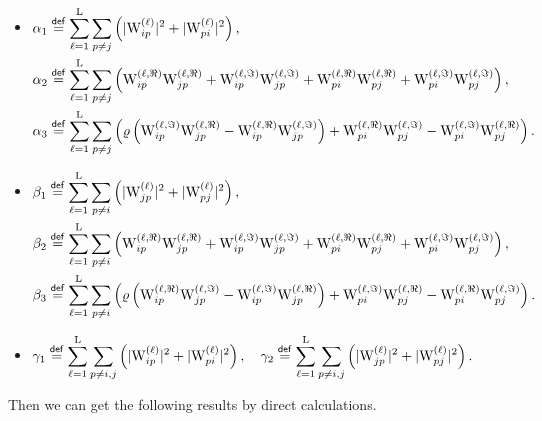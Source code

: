 \documentclass[final,onefignum,onetabnum]{siamart190516}
\newcommand{\eqdef}{\stackrel{\sf def}{=}}
\newcommand{\R}{\Re}
\newcommand{\I}{\Im}
\newcommand{\matrelem}[1]{\mathrm{#1}}
\begin{document}
\begin{itemize}
\item 
$\begin{aligned}[t]
&\alpha_{1} \eqdef  \sum_{\ell=1}^{\matrelem{L}}\sum_{p\neq j}\left(|\matrelem{W}^{(\ell)}_{ip}|^2+|\matrelem{W}^{(\ell)}_{pi}|^2\right), \\
&\alpha_{2} \eqdef  \sum_{\ell=1}^{\matrelem{L}}\sum_{p\neq j}\left(\matrelem{W}^{(\ell,\R)}_{ip}\matrelem{W}^{(\ell,\R)}_{jp}+\matrelem{W}^{(\ell,\I)}_{ip}\matrelem{W}^{(\ell,\I)}_{jp}+\matrelem{W}^{(\ell,\R)}_{pi}\matrelem{W}^{(\ell,\R)}_{pj}+\matrelem{W}^{(\ell,\I)}_{pi}\matrelem{W}^{(\ell,\I)}_{pj}\right), \\
&\alpha_{3} \eqdef   \sum_{\ell=1}^{\matrelem{L}}\sum_{p\neq j}\left(\varrho\left(\matrelem{W}^{(\ell,\I)}_{ip}\matrelem{W}^{(\ell,\R)}_{jp}-\matrelem{W}^{(\ell,\R)}_{ip}\matrelem{W}^{(\ell,\I)}_{jp}\right)+\matrelem{W}^{(\ell,\R)}_{pi}\matrelem{W}^{(\ell,\I)}_{pj}-\matrelem{W}^{(\ell,\I)}_{pi}\matrelem{W}^{(\ell,\R)}_{pj}\right).
\end{aligned}$
\item 
$\begin{aligned}[t]
&\beta_{1} \eqdef  \sum_{\ell=1}^{\matrelem{L}}\sum_{p\neq i}\left(|\matrelem{W}^{(\ell)}_{jp}|^2+|\matrelem{W}^{(\ell)}_{pj}|^2\right), \\
&\beta_{2} \eqdef  \sum_{\ell=1}^{\matrelem{L}}\sum_{p\neq i}\left(\matrelem{W}^{(\ell,\R)}_{ip}\matrelem{W}^{(\ell,\R)}_{jp}+\matrelem{W}^{(\ell,\I)}_{ip}\matrelem{W}^{(\ell,\I)}_{jp}+\matrelem{W}^{(\ell,\R)}_{pi}\matrelem{W}^{(\ell,\R)}_{pj}+\matrelem{W}^{(\ell,\I)}_{pi}\matrelem{W}^{(\ell,\I)}_{pj}\right),  \\
&\beta_{3} \eqdef  \sum_{\ell=1}^{\matrelem{L}}\sum_{p\neq i}\left(\varrho\left(\matrelem{W}^{(\ell,\R)}_{ip}\matrelem{W}^{(\ell,\I)}_{jp}-\matrelem{W}^{(\ell,\I)}_{ip}\matrelem{W}^{(\ell,\R)}_{jp}\right)+\matrelem{W}^{(\ell,\I)}_{pi}\matrelem{W}^{(\ell,\R)}_{pj}-\matrelem{W}^{(\ell,\R)}_{pi}\matrelem{W}^{(\ell,\I)}_{pj}\right).
\end{aligned}$
\item 
$\begin{aligned}[t]
&\gamma_{1} \eqdef  \sum_{\ell=1}^{\matrelem{L}}\sum_{p\neq i,j}\left(|{\matrelem{W}^{(\ell)}_{ip}}|^2+|{\matrelem{W}^{(\ell)}_{pi}}|^2\right), \ \ \ 
\gamma_{2} \eqdef  \sum_{\ell=1}^{\matrelem{L}}\sum_{p\neq i,j}\left(|{\matrelem{W}^{(\ell)}_{jp}}|^2+|{\matrelem{W}^{(\ell)}_{pj}}|^2\right). 
\end{aligned}$
\end{itemize}
Then we can get the following results by direct calculations.
\end{document}
